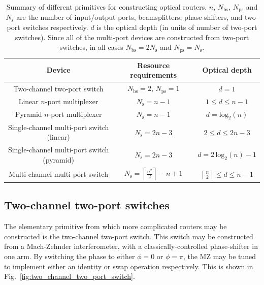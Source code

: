 \documentclass[aps,rmp,twocolumn,amsmath,amssymb,nofootinbib,superscriptaddress,longbibliography,floatfix,table-of-contents,eqsecnum]{revtex4-1}
\renewcommand{\tablename}{ALG.}
\begin{document}
\begin{table}[!htb]
	\begin{tabular}{|c|c|c|}
		\hline
  		Device & Resource requirements & Optical depth \\
  		\hline
  		\hline
  		Two-channel two-port switch & \mbox{$N_\mathrm{bs}=2$}, \mbox{$N_\mathrm{ps}=1$} & \mbox{$d=1$} \\
  		Linear $n$-port multiplexer & \mbox{$N_\mathrm{s}=n-1$} & \mbox{$1\leq d\leq n-1$} \\
  		Pyramid $n$-port multiplexer & \mbox{$N_\mathrm{s}=n-1$} & \mbox{$d=\mathrm{log}_2(n)$} \\
    	Single-channel multi-port switch (linear) & \mbox{$N_\mathrm{s}=2n-3$} & \mbox{$2\leq d\leq 2n-3$} \\
  		Single-channel multi-port switch (pyramid) & \mbox{$N_\mathrm{s}=2n-3$} & \mbox{$d=2\,\mathrm{log}_2(n)-1$} \\
  		Multi-channel multi-port switch & \mbox{$N_\mathrm{s} = \left\lceil \frac{n^2}{2}\right\rceil - n + 1$} & \mbox{$\left\lceil \frac{n}{2} \right\rceil \leq d\leq n-1$} \\
    	\hline
	\end{tabular}
	\caption{Summary of different primitives for constructing optical routers. $n$, $N_\mathrm{bs}$, $N_\mathrm{ps}$ and $N_\mathrm{s}$ are the number of input/output ports, beamsplitters, phase-shifters, and two-port switches respectively. $d$ is the optical depth (in units of number of two-port switches). Since all of the multi-port devices are constructed from two-port switches, in all cases \mbox{$N_\mathrm{bs} = 2 N_\mathrm{s}$} and \mbox{$N_\mathrm{ps} = N_\mathrm{s}$}.} \label{tab:router_summary} 
\end{table}

\renewcommand{\tablename}{ALG.}

%
%

\subsection{Two-channel two-port switches} 

The elementary primitive from which more complicated routers may be constructed is the two-channel two-port switch. This switch may be constructed from a Mach-Zehnder interferometer, with a classically-controlled phase-shifter in one arm. By switching the phase to either \mbox{$\phi=0$} or \mbox{$\phi=\pi$}, the MZ may be tuned to implement either an identity or swap operation respectively. This is shown in Fig.~\ref{fig:two_channel_two_port_switch}.
\end{document}

